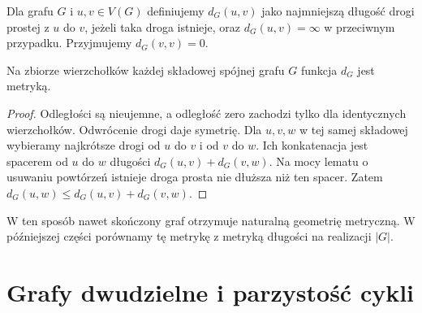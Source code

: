 \begin{center}
\end{center}

\begin{definicja}[Odległość]
Dla grafu $G$ i $u,v\in V(G)$ definiujemy
$d_G(u,v)$ jako najmniejszą długość drogi
prostej z $u$ do $v$, jeżeli taka droga istnieje,
oraz $d_G(u,v)=\infty$ w przeciwnym przypadku.
Przyjmujemy $d_G(v,v)=0$.
\end{definicja}

\begin{stwierdzenie}
Na zbiorze wierzchołków każdej składowej spójnej
grafu $G$ funkcja $d_G$ jest metryką.
\end{stwierdzenie}

\begin{proof}
Odległości są nieujemne, a odległość zero zachodzi
tylko dla identycznych wierzchołków. Odwrócenie
drogi daje symetrię. Dla $u,v,w$ w tej samej
składowej wybieramy najkrótsze drogi od $u$ do $v$
i od $v$ do $w$. Ich konkatenacja jest spacerem od
$u$ do $w$ długości $d_G(u,v)+d_G(v,w)$.
Na mocy lematu o usuwaniu powtórzeń istnieje droga
prosta nie dłuższa niż ten spacer. Zatem
$d_G(u,w)\le d_G(u,v)+d_G(v,w)$.
\end{proof}

W ten sposób nawet skończony graf otrzymuje naturalną
geometrię metryczną. W późniejszej części porównamy tę
metrykę z metryką długości na realizacji $|G|$.

\section{Grafy dwudzielne i parzystość cykli}
\label{sec:tg-dwudzielne}

